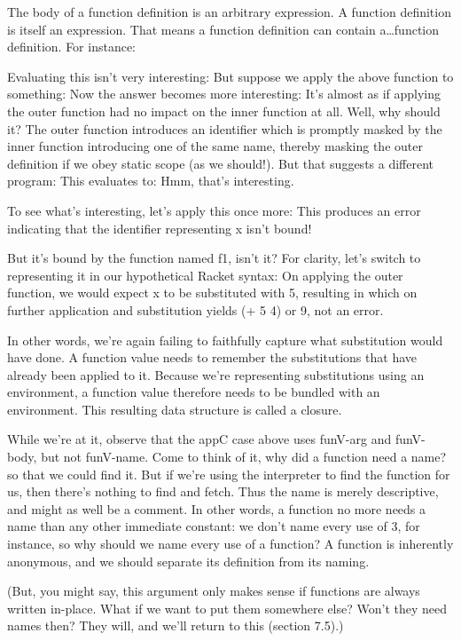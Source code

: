 
The body of a function definition is an arbitrary expression. A function
definition is itself an expression. That means a function definition can contain
a\ldots function definition. For instance:

Evaluating this isn’t very interesting:
But suppose we apply the above function to something:
Now the answer becomes more interesting:
It’s almost as if applying the outer function had no impact on the inner
function at all. Well, why should it? The outer function introduces an
identifier which is promptly masked by the inner function introducing one of the
same name, thereby masking the outer definition if we obey static scope (as we
should!). But that suggests a different program:
This evaluates to:
Hmm, that’s interesting.

To see what’s interesting, let’s apply this once more:
This produces an error indicating that the identifier representing x isn’t
bound!

But it’s bound by the function named f1, isn’t it? For clarity, let’s switch to
representing it in our hypothetical Racket syntax:
On applying the outer function, we would expect x to be substituted with 5,
resulting in
which on further application and substitution yields (+ 5 4) or 9, not an error.

In other words, we’re again failing to faithfully capture what substitution
would have done. A function value needs to remember the substitutions that have
already been applied to it. Because we’re representing substitutions using an
environment, a function value therefore needs to be bundled with an environment.
This resulting data structure is called a closure.

While we’re at it, observe that the appC case above uses funV-arg and funV-
body, but not funV-name. Come to think of it, why did a function need a name? so
that we could find it. But if we’re using the interpreter to find the function
for us, then there’s nothing to find and fetch. Thus the name is merely
descriptive, and might as well be a comment. In other words, a function no more
needs a name than any other immediate constant: we don’t name every use of 3,
for instance, so why should we name every use of a function? A function is
inherently anonymous, and we should separate its definition from its naming.

(But, you might say, this argument only makes sense if functions are always
written in-place. What if we want to put them somewhere else? Won’t they need
names then? They will, and we’ll return to this (section 7.5).)
